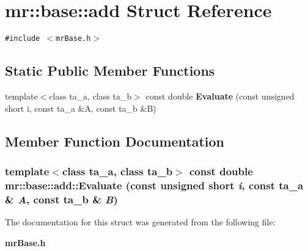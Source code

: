 \section{mr::base::add Struct Reference}
\label{structmr_1_1base_1_1add}
{\tt \#include $<$mr\-Base.h$>$}

\subsection*{Static Public Member Functions}
\begin{CompactItemize}
\item 
template$<$class ta\_\-a, class ta\_\-b$>$ const double {\bf Evaluate} (const unsigned short i, const ta\_\-a \&A, const ta\_\-b \&B)
\end{CompactItemize}


\subsection{Member Function Documentation}
\subsubsection{\setlength{\rightskip}{0pt plus 5cm}template$<$class ta\_\-a, class ta\_\-b$>$ const double mr::base::add::Evaluate (const unsigned short {\em i}, const ta\_\-a \& {\em A}, const ta\_\-b \& {\em B})\hspace{0.3cm}{\tt  [inline, static]}}\label{structmr_1_1base_1_1add_e0}




The documentation for this struct was generated from the following file:\begin{CompactItemize}
\item 
{\bf mr\-Base.h}\end{CompactItemize}
